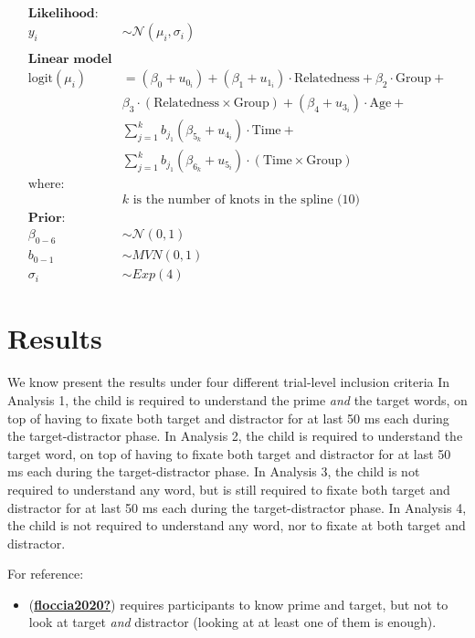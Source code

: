 \documentclass[
  letterpaper,
  DIV=11,
  numbers=noendperiod]{scrartcl}
\providecommand{\tightlist}{%
  \setlength{\itemsep}{0pt}\setlength{\parskip}{0pt}}\usepackage{longtable,booktabs,array}
\begin{document}
\[
\begin{aligned}
\textbf{Likelihood:} \\
y_i &\sim \mathcal{N}(\mu_i, \sigma_i) \\ \\
\textbf{Linear model} \\
\text{logit}(\mu_i) &= (\beta_0 + u _{0_{i}}) + (\beta_1 + u _{1_{i}}) \cdot \text{Relatedness} + \beta_{2} \cdot \text{Group} + \\
&\beta_{3} \cdot (\text{Relatedness} \times \text{Group}) + (\beta_4 + u_{3_{i}}) \cdot \text{Age} + \\
&\sum_{j = 1}^k b_{j_{1}}(\beta_{5_{k}} + u_{4_{i}}) \cdot \text{Time} + \\
&\sum_{j = 1}^k b_{j_{1}} (\beta_{6_{k }} + u_{5_{i}}) \cdot (\text{Time} \times \text{Group}) \\
\text{where:} \\
&k \text{ is the number of knots in the spline (10)} \\
\textbf{Prior:} \\
\beta_{0-6} &\sim \mathcal{N}(0, 1) \\
b_{0-1} &\sim MVN(0, 1) \\
\sigma_i &\sim Exp(4) 
\end{aligned}
\]

\hypertarget{results}{%
\section{Results}\label{results}}

We know present the results under four different trial-level inclusion
criteria In Analysis 1, the child is required to understand the prime
\emph{and} the target words, on top of having to fixate both target and
distractor for at last 50 ms each during the target-distractor phase. In
Analysis 2, the child is required to understand the target word, on top
of having to fixate both target and distractor for at last 50 ms each
during the target-distractor phase. In Analysis 3, the child is not
required to understand any word, but is still required to fixate both
target and distractor for at last 50 ms each during the
target-distractor phase. In Analysis 4, the child is not required to
understand any word, nor to fixate at both target and distractor.

For reference:

\begin{itemize}
\tightlist
\item
  (\protect\hyperlink{ref-floccia2020}{\textbf{floccia2020?}}) requires
  participants to know prime and target, but not to look at target
  \emph{and} distractor (looking at at least one of them is enough).
\end{itemize}
\end{document}
